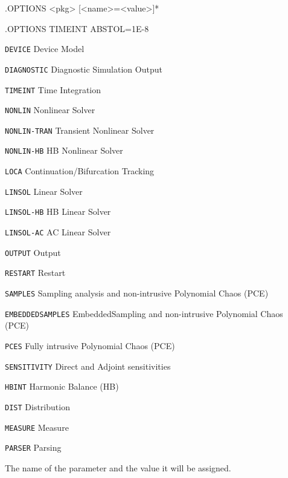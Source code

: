 \begin{Command}
\format
.OPTIONS <pkg> [<name>=<value>]*

\examples
.OPTIONS TIMEINT ABSTOL=1E-8

\arguments

\begin{Arguments}


\begin{basedescript}{
    \desclabelstyle{\multilinelabel}
    \desclabelwidth{1.5in}
    \renewcommand{\makelabel}[1]{\tt #1\hfill}}
  \item[\tt DEVICE]       Device Model
  \item[\tt DIAGNOSTIC]   Diagnostic Simulation Output
  \item[\tt TIMEINT]      Time Integration
  \item[\tt NONLIN]       Nonlinear Solver
  \item[\tt NONLIN-TRAN]  Transient Nonlinear Solver
  \item[\tt NONLIN-HB]    HB Nonlinear Solver
  \item[\tt LOCA]         Continuation/Bifurcation Tracking
  \item[\tt LINSOL]       Linear Solver
  \item[\tt LINSOL-HB]    HB Linear Solver
  \item[\tt LINSOL-AC]    AC Linear Solver
  \item[\tt OUTPUT]       Output
  \item[\tt RESTART]      Restart
  \item[\tt SAMPLES]      Sampling analysis and non-intrusive Polynomial Chaos (PCE)
  \item[\tt EMBEDDEDSAMPLES]  EmbeddedSampling and non-intrusive Polynomial Chaos (PCE) 
  \item[\tt PCES]         Fully intrusive Polynomial Chaos (PCE)
  \item[\tt SENSITIVITY]  Direct and Adjoint sensitivities
  \item[\tt HBINT]        Harmonic Balance (HB)
  \item[\tt DIST]         Distribution
  \item[\tt MEASURE]      Measure
  \item[\tt PARSER]       Parsing
\end{basedescript}

The name of the parameter and the value it will be assigned.


\end{Arguments}
\end{Command}
